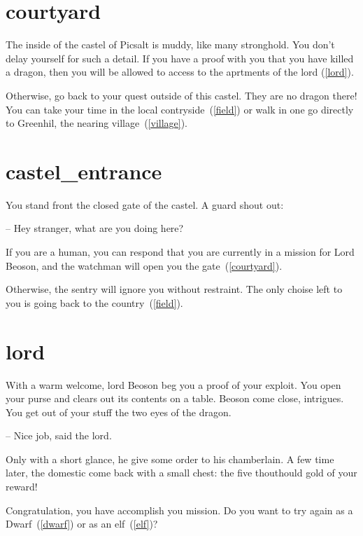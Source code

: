 \section{courtyard}

The inside of the castel of Picsalt is muddy, like many stronghold. You don't
delay yourself for such a detail. If you have a proof with you that you have
killed a dragon, then you will be allowed to access to the aprtments of the lord
(\ref{lord}).

Otherwise, go back to your quest outside of this castel. They are no dragon
there! You can take your time in the local contryside~(\ref{field}) or walk in
one go directly to Greenhil, the nearing village~(\ref{village}).

\section{castel_entrance}

You stand front the closed gate of the castel. A guard shout out:

-- Hey stranger, what are you doing here?

If you are a human, you can respond that you are currently in a mission for Lord
Beoson, and the watchman will open you the gate~(\ref{courtyard}).

Otherwise, the sentry will ignore you without restraint. The only choise
left to you is going back to the country~(\ref{field}).

\section{lord}

With a warm welcome, lord Beoson beg you a proof of your exploit.  You open
your purse and clears out its contents on a table. Beoson come close,
intrigues. You get out of your stuff the two eyes of the dragon.

-- Nice job, said the lord.

Only with a short glance, he give some order to his chamberlain. A few time
later, the domestic come back with a small chest: the five thouthould gold of
your reward!

\medbreak

Congratulation, you have accomplish you mission. Do you want to try again as a
Dwarf~(\ref{dwarf}) or as an elf~(\ref{elf})?
